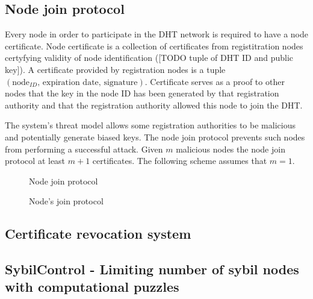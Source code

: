 \subsection{Node join protocol}

Every node in order to participate in the DHT network is required to have a node
certificate. Node certificate is a collection of certificates from registitration
nodes certyfying validity of node identification ([TODO tuple of DHT ID and
public key]). A certificate provided by registration nodes is a tuple
$\left(\text{node}_{ID}, \, \text{expiration date}, \, \text{signature}\right)$.
Certificate serves as a proof to other nodes that the key in the node ID has been
generated by that registration authority and that the registration authority
allowed this node to join the DHT.

The system's threat model allows some registration authorities to be malicious
and potentially generate biased keys. The node join protocol prevents such nodes
from performing a successful attack. Given $m$ malicious nodes the node join
protocol at least $m+1$ certificates. The following scheme assumes that $m = 1$.

\begin{figure}
\begin{msc}{Node join protocol}
\setlength{\instdist}{5.5cm}
\setlength{\envinstdist}{3cm}
\nextlevel[2]
\nextlevel
{}
\nextlevel[4]
\nextlevel[2]
\nextlevel[2]
\nextlevel[2]
\nextlevel[2]
\nextlevel[2]
\nextlevel[2]
\nextlevel[2]
\nextlevel[1]
\end{msc}
\caption{Node's join protocol}
\end{figure}

\subsection{Certificate revocation system}

\subsection{SybilControl - Limiting number of sybil nodes with computational
puzzles}
